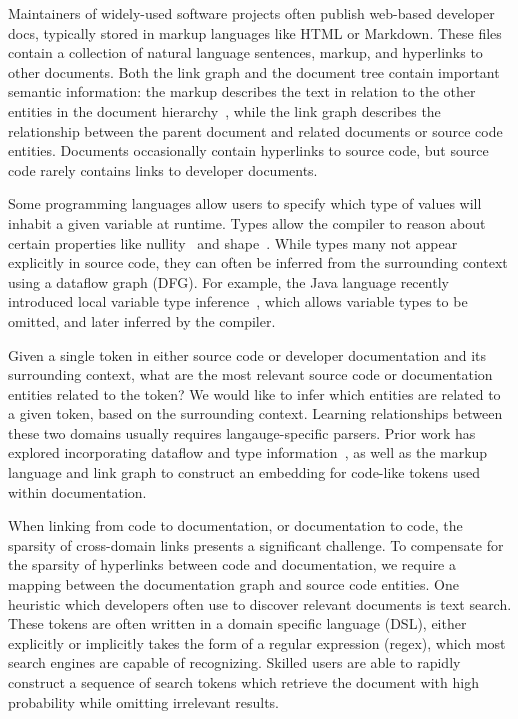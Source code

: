\documentclass{article}
\begin{document}
Maintainers of widely-used software projects often publish web-based developer docs, typically stored in markup languages like HTML or Markdown. These files contain a collection of natural language sentences, markup, and hyperlinks to other documents. Both the link graph and the document tree contain important semantic information: the markup describes the text in relation to the other entities in the document hierarchy~\citep{yang2016hierarchical}, while the link graph describes the relationship between the parent document and related documents or source code entities. Documents occasionally contain hyperlinks to source code, but source code rarely contains links to developer documents.

Some programming languages allow users to specify which type of values will inhabit a given variable at runtime. Types allow the compiler to reason about certain properties like nullity~\citep{ekman2007pluggable} and shape~\citep{considine2019kotlingrad}. While types many not appear explicitly in source code, they can often be inferred from the surrounding context using a dataflow graph (DFG). For example, the Java language recently introduced local variable type inference~\citet{liddell2019analyzing}, which allows variable types to be omitted, and later inferred by the compiler.

Given a single token in either source code or developer documentation and its surrounding context, what are the most relevant source code or documentation entities related to the token? We would like to infer which entities are related to a given token, based on the surrounding context. Learning relationships between these two domains usually requires langauge-specific parsers. Prior work has explored incorporating dataflow and type information~\citet{si2018learning, gu2018deep, liu2019neural}, as well as the markup language and link graph\citet{yang2016hierarchical, zhang2018link} to construct an embedding for code-like tokens used within documentation.

When linking from code to documentation, or documentation to code, the sparsity of cross-domain links presents a significant challenge. To compensate for the sparsity of hyperlinks between code and documentation, we require a mapping between the documentation graph and source code entities. One heuristic which developers often use to discover relevant documents is text search. These tokens are often written in a domain specific language (DSL), either explicitly or implicitly takes the form of a regular expression (regex), which most search engines are capable of recognizing. Skilled users are able to rapidly construct a sequence of search tokens which retrieve the document with high probability while omitting irrelevant results.
\end{document}
